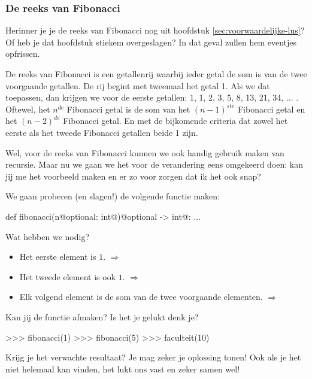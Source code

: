 \subsubsection{De reeks van Fibonacci}

Herinner je je de reeks van Fibonacci nog uit hoofdstuk \ref{sec:voorwaardelijke-lus}?
Of heb je dat hoofdstuk stiekem overgeslagen?
In dat geval zullen hem eventjes opfrissen.
\par
De reeks van Fibonacci is een getallenrij waarbij ieder getal de som is van de twee voorgaande getallen.
De rij begint met tweemaal het getal 1.
Als we dat toepassen, dan krijgen we voor de eerste getallen: 1, 1, 2, 3, 5, 8, 13, 21, 34, ... .
\newline
Oftewel, het $n^{de}$ Fibonacci getal is de som van het $(n - 1)^{ste}$ Fibonacci getal en het $(n - 2)^{de}$ Fibonacci getal.
En met de bijkomende criteria dat zowel het eerste als het tweede Fibonacci getallen beide 1 zijn.
\par
Wel, voor de reeks van Fibonacci kunnen we ook handig gebruik maken van recursie.
Maar nu we gaan we het voor de verandering eens omgekeerd doen:
kan jij me het voorbeeld maken en er zo voor zorgen dat ik het ook snap?
\begin{letsTryOut}
	We gaan proberen (en slagen!) de volgende functie maken:
\begin{pyEnv}
def fibonacci(n@optional: int@)@optional -> int@:
	...
\end{pyEnv}
	Wat hebben we nodig?
	\begin{itemize}
		\item
			Het eerste element is $1$.
			\newline
			$\Rightarrow$ 
		\item
			Het tweede element is ook $1$.
			\newline
			$\Rightarrow$ 
		\item
			Elk volgend element is de som van de twee voorgaande elementen.
			\newline
			$\Rightarrow$ 
	\end{itemize}
	Kan jij de functie afmaken?
	\newline
	Is het je gelukt denk je?
\begin{pyEnv}
>>> fibonacci(1)
>>> fibonacci(5)
>>> faculteit(10)
\end{pyEnv}
	Krijg je het verwachte resultaat?
	\newline
	\newline
	Je mag zeker je oplossing tonen!
	Ook als je het niet helemaal kan vinden,
	het lukt ons vast en zeker samen wel!
\end{letsTryOut}

